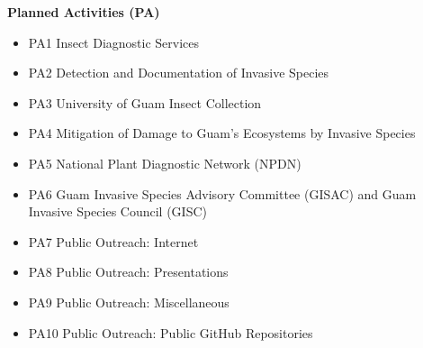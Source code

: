 \textbf{Planned Activities (PA)}
\begin{itemize}
\item PA1 Insect Diagnostic Services
\item PA2 Detection and Documentation of Invasive Species
\item PA3 University of Guam Insect Collection
\item PA4 Mitigation of Damage to Guam's Ecosystems by Invasive Species
\item PA5 National Plant Diagnostic Network (NPDN)
\item PA6 Guam Invasive Species Advisory Committee (GISAC) and Guam Invasive Species Council (GISC)
\item PA7 Public Outreach: Internet
\item PA8 Public Outreach: Presentations
\item PA9 Public Outreach: Miscellaneous
\item PA10 Public Outreach: Public GitHub Repositories
\end{itemize}

